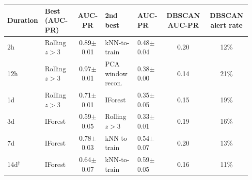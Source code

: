 \begin{tabular}{llcllcc}
\toprule
Duration & Best (AUC-PR) & AUC-PR & 2nd best & AUC-PR & DBSCAN AUC-PR & DBSCAN alert rate \\
\midrule
2h & Rolling $z>3$ & 0.89$\pm$0.01 & kNN-to-train & 0.48$\pm$0.04 & 0.20 & 12\% \\
12h & Rolling $z>3$ & 0.97$\pm$0.01 & PCA window recon. & 0.38$\pm$0.00 & 0.14 & 21\% \\
1d & Rolling $z>3$ & 0.71$\pm$0.01 & IForest & 0.35$\pm$0.05 & 0.15 & 19\% \\
3d & IForest & 0.59$\pm$0.05 & Rolling $z>3$ & 0.33$\pm$0.01 & 0.19 & 16\% \\
7d & IForest & 0.78$\pm$0.03 & kNN-to-train & 0.54$\pm$0.07 & 0.20 & 13\% \\
14d$^\dagger$ & IForest & 0.64$\pm$0.07 & kNN-to-train & 0.59$\pm$0.05 & 0.16 & 11\% \\
\bottomrule
\end{tabular}
